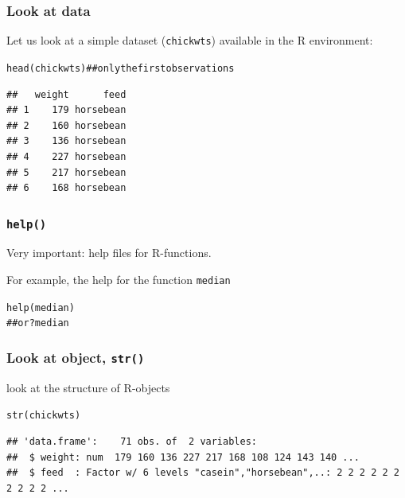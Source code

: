 \documentclass[extsize,handout,10pt]{beamer}\usepackage[]{graphicx}\usepackage[]{color}
\makeatletter
\newcommand{\hlcom}[1]{\textcolor[rgb]{1,0.251,0.502}{#1}}%
\newcommand{\hlstd}[1]{\textcolor[rgb]{0.251,0.251,0.251}{#1}}%
\newcommand{\hlkwd}[1]{\textcolor[rgb]{0.69,0.188,0.941}{#1}}%
\newenvironment{kframe}{%
 \def\at@end@of@kframe{}%
 \ifinner\ifhmode%
  \def\at@end@of@kframe{\end{minipage}}%
  \begin{minipage}{\columnwidth}%
 \fi\fi%
 \def\FrameCommand##1{\hskip\@totalleftmargin \hskip-\fboxsep
 \colorbox{shadecolor}{##1}\hskip-\fboxsep
     \hskip-\linewidth \hskip-\@totalleftmargin \hskip\columnwidth}%
 \MakeFramed {\advance\hsize-\width
   \@totalleftmargin\z@ \linewidth\hsize
   \@setminipage}}%
 {\par\unskip\endMakeFramed%
 \at@end@of@kframe}
\newenvironment{knitrout}{}{} %
\makeatother
\begin{document}
\begin{frame}[containsverbatim]
  \frametitle{Look at data}
  \small
Let us look at a simple dataset
    (\alert{\texttt{chickwts}}) available in the \textsf{R} environment:
    
\begin{knitrout}\tiny
{}\color{fgcolor}\begin{kframe}
\begin{alltt}
\hlkwd{head}\hlstd{(chickwts)} \hlcom{##only the first observations}
\end{alltt}
\begin{verbatim}
##   weight      feed
## 1    179 horsebean
## 2    160 horsebean
## 3    136 horsebean
## 4    227 horsebean
## 5    217 horsebean
## 6    168 horsebean
\end{verbatim}
\end{kframe}
\end{knitrout}
\end{frame}


\begin{frame}[containsverbatim]
  \frametitle{\texttt{help()}}
\alert{Very important: help files for \textsf{R}-functions}. 

For example, the help for the function \texttt{median}

\begin{knitrout}\tiny
{}\color{fgcolor}\begin{kframe}
\begin{alltt}
\hlkwd{help}\hlstd{(median)}
\hlcom{## or ?median}
\end{alltt}
\end{kframe}
\end{knitrout}

\end{frame}


\begin{frame}[containsverbatim]
    \frametitle{Look at object, \texttt{str()}}
  look at the \alert{structure} of \textsf{R}-objects
  \small
  
\begin{knitrout}\tiny
{}\color{fgcolor}\begin{kframe}
\begin{alltt}
\hlkwd{str}\hlstd{(chickwts)}
\end{alltt}
\begin{verbatim}
## 'data.frame':	71 obs. of  2 variables:
##  $ weight: num  179 160 136 227 217 168 108 124 143 140 ...
##  $ feed  : Factor w/ 6 levels "casein","horsebean",..: 2 2 2 2 2 2 2 2 2 2 ...
\end{verbatim}
\end{kframe}
\end{knitrout}

\end{frame}
\end{document}
